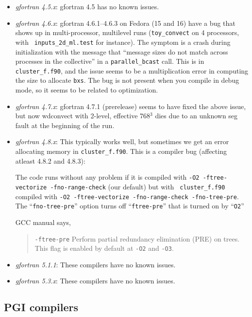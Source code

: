 \begin{itemize}
\item {\em gfortran 4.5.x}: gfortran 4.5 has no known issues.

\item {\em gfortran 4.6.x}: gfortran 4.6.1--4.6.3 on Fedora 
(15 and 16) have a bug that shows up in multi-processor, multilevel
runs ({\tt toy\_convect} on 4 processors, with {\tt
inputs\_2d\_ml.test} for instance).  The symptom is a crash during
initialization with the message that ``message sizes do not match
across processes in the collective'' in a {\tt parallel\_bcast} call.
This is in {\tt cluster\_f.f90}, and the issue seems to be a
multiplication error in computing the size to allocate {\tt bxs}.  The
bug is not present when you compile in debug mode, so it seems to be
related to optimization.

\item {\em gfortran 4.7.x}: gfortran 4.7.1 (prerelease) seems to have 
fixed the above issue, but now wdconvect with 2-level, effective
768$^3$ dies due to an unknown seg fault at the beginning of the run.

\item {\em gfortran 4.8.x}: This typically works well, but sometimes we get
an error allocating memory in {\tt cluster\_f.f90}.  This
is a compiler bug (affecting atleast 4.8.2 and 4.8.3):

The code runs without any problem if it is compiled with {\tt -O2
-ftree-vectorize -fno-range-check} (our default) but with {\tt
cluster\_f.f90} compiled with {\tt -O2 -ftree-vectorize
-fno-range-check -fno-tree-pre}.  The ``{\tt fno-tree-pre}'' option
turns off ``{\tt ftree-pre}'' that is turned on by ``{\tt O2}''
 
GCC manual says,

\begin{quote}
{\tt -ftree-pre} \newline
Perform partial redundancy elimination (PRE) on trees. This flag is enabled by default at {\tt -O2} and {\tt -O3}.
\end{quote}

\item {\em gfortran 5.1.1}: These compilers have no known issues.

\item {\em gfortran 5.3.x}: These compilers have no known issues.

\end{itemize}

\subsection{PGI compilers}

